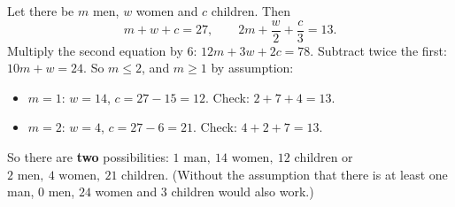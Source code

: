 Let there be $m$ men, $w$ women and $c$ children. Then
\[
m+w+c=27,\qquad 2m+\dfrac {w}{2}+\dfrac {c}{3}=13 .
\]
Multiply the second equation by $6$: $12m+3w+2c=78$. Subtract twice the first: $10m+w=24$. So $m\le2$, and $m\ge1$ by assumption:
\begin{itemize}
\item $m=1$: $w=14$, $c=27-15=12$. Check: $2+7+4=13$.
\item $m=2$: $w=4$, $c=27-6=21$. Check: $4+2+7=13$.
\end{itemize}
So there are \textbf{two} possibilities: $\boxed{1\text{ man},\ 14\text{ women},\ 12\text{ children}}$ or $\boxed{2\text{ men},\ 4\text{ women},\ 21\text{ children}}$. (Without the assumption that there is at least one man, $0$ men, $24$ women and $3$ children would also work.)
